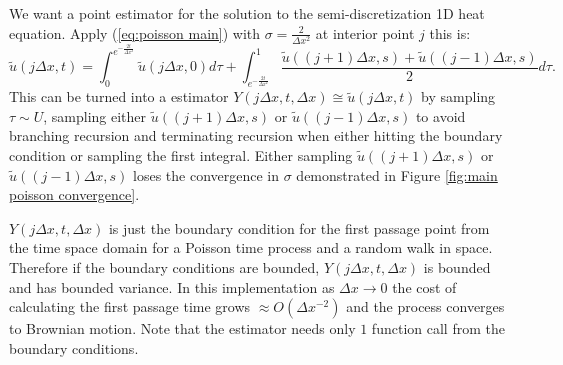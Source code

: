 \documentclass[a4paper,12pt]{article}
\begin{document}
\begin{example} \label{ex: point estimator of semi heat}
  We want a point estimator for the solution to the semi-discretization 1D heat equation. Apply (\ref{eq:poisson main})
  with $\sigma = \frac{2}{\Delta x^{2}}$ at interior point $j$ this is:
  \begin{equation}
    \tilde{u}(j \Delta x,t) = \int_{0}^{e^{-\frac{2t}{\Delta x^{2}}}}  \tilde{u}(j \Delta x,0) d\tau+
    \int_{e^{-\frac{2t}{\Delta x^{2}}}}^{1} \frac{\tilde{u}((j+1) \Delta x,s)+\tilde{u}((j-1) \Delta x,s)}{2}d\tau. \label{eq:int semi heat}
  \end{equation}
  This can be turned into a estimator $Y(j \Delta x,t,\Delta x ) \cong  \tilde{u}(j \Delta x,t)$
  by sampling $\tau \sim U$,
  sampling either $\tilde{u}((j+1) \Delta x,s)$ or $\tilde{u}((j-1) \Delta x,s)$ to avoid branching recursion and
  terminating recursion when either hitting the boundary condition or sampling the first integral. Either sampling
  $\tilde{u}((j+1) \Delta x,s)$ or $\tilde{u}((j-1) \Delta x,s)$ loses
  the convergence in $\sigma$ demonstrated in Figure \ref{fig:main poisson convergence}.
\end{example}

\begin{julia}\label{jl:point estimator heat}


  $Y(j \Delta x,t,\Delta x )$ is just the boundary condition
  for the first passage point from the time space domain for a Poisson time process and a random walk in space.
  Therefore if the boundary conditions are bounded, $Y(j \Delta x,t,\Delta x )$ is bounded and has bounded variance.
  In this implementation as  $\Delta x \rightarrow 0$  the cost of calculating the first passage time grows
  $\approx O(\Delta x ^{-2})$ and the process converges to Brownian motion. Note that the estimator needs
  only $1$ function call from the boundary conditions.

\end{julia}
\end{document}
